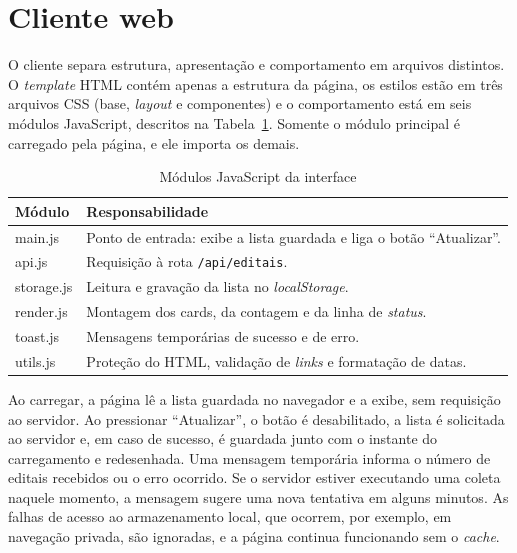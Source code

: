 \section{Cliente web}
\label{sec:impl_cliente}

O cliente separa estrutura, apresentação e comportamento em arquivos
distintos. O \textit{template} HTML contém apenas a estrutura da página, os
estilos estão em três arquivos CSS (base, \textit{layout} e componentes) e o
comportamento está em seis módulos JavaScript, descritos na
Tabela~\ref{tab:modulos_js}. Somente o módulo principal é carregado pela
página, e ele importa os demais.

\begin{table}[htbp]
\centering
\caption{Módulos JavaScript da interface}
\label{tab:modulos_js}
\small
\begin{tabularx}{\textwidth}{>{\ttfamily}l X}
\toprule
\normalfont Módulo & Responsabilidade \\
\midrule
main.js    & Ponto de entrada: exibe a lista guardada e liga o botão
             ``Atualizar''. \\
api.js     & Requisição à rota \texttt{/api/editais}. \\
storage.js & Leitura e gravação da lista no \textit{localStorage}. \\
render.js  & Montagem dos cards, da contagem e da linha de \textit{status}. \\
toast.js   & Mensagens temporárias de sucesso e de erro. \\
utils.js   & Proteção do HTML, validação de \textit{links} e formatação de
             datas. \\
\bottomrule
\end{tabularx}
\end{table}

Ao carregar, a página lê a lista guardada no navegador e a exibe, sem
requisição ao servidor. Ao pressionar ``Atualizar'', o botão é desabilitado, a
lista é solicitada ao servidor e, em caso de sucesso, é guardada junto com o
instante do carregamento e redesenhada. Uma mensagem temporária informa o
número de editais recebidos ou o erro ocorrido. Se o servidor estiver
executando uma coleta naquele momento, a mensagem sugere uma nova tentativa
em alguns minutos. As falhas de acesso ao armazenamento local, que ocorrem,
por exemplo, em navegação privada, são ignoradas, e a página continua
funcionando sem o \textit{cache}.

